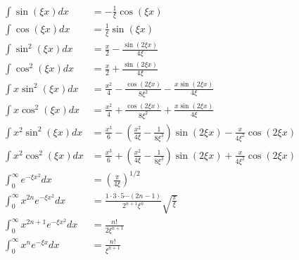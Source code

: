 \begin{align*}
\int \sin \left(\xi x\right) dx &= -\frac{1}{\xi} \cos \left(\xi x\right)\\
\int \cos \left(\xi x\right) dx &= \frac{1}{\xi} \sin \left(\xi x\right)\\
\int \sin^2 \left(\xi x\right) dx &= \frac{x}{2} - \frac{\sin \left(2\xi x\right)} {4\xi} \\
\int \cos^2 \left(\xi x\right) dx &= \frac{x}{2} + \frac{\sin \left(2\xi x\right)} {4\xi} \\
\int x \sin^2 \left(\xi x \right) dx &= \frac{x^2}{4} - \frac{\cos \left(2\xi x\right)}{8\xi^2} - \frac{x \sin \left(2\xi x\right)}{4\xi}\\
\int x \cos^2 \left(\xi x \right) dx &= \frac{x^2}{4} + \frac{\cos \left(2\xi x\right)}{8\xi^2} + \frac{x \sin \left(2\xi x\right)}{4\xi}\\
\int x^2 \sin^2 \left(\xi x \right) dx &= \frac{x^3}{6} - \left(\frac{x^2}{4\xi}-\frac{1}{8\xi^3}\right)\sin\left(2\xi x \right) -\frac{x}{4\xi^2}\cos\left(2\xi x\right)\\
\int x^2 \cos^2 \left(\xi x \right) dx &= \frac{x^3}{6} + \left(\frac{x^2}{4\xi}-\frac{1}{8\xi^3}\right)\sin\left(2\xi x \right) +\frac{x}{4\xi^2}\cos\left(2\xi x\right)\\
\int_0^{\infty} e^{-\xi x^2}dx &= \left(\frac{\pi}{4\xi} \right)^{1/2}\\
\int_0^\infty x^{2n}e^{-\xi x^2}dx&=\frac{1\cdot 3 \cdot 5 \cdots \left(2n-1\right)}{2^{n+1}\xi^n}\sqrt{\frac{\pi}{\xi}}\\
\int_0^\infty x^{2n+1}e^{-\xi x^2}dx&=\frac{n!}{2\xi^{n+1}}\\
\int_0^\infty x^{n}e^{-\xi x}dx&=\frac{n!}{\xi^{n+1}}\\
\end{align*}
